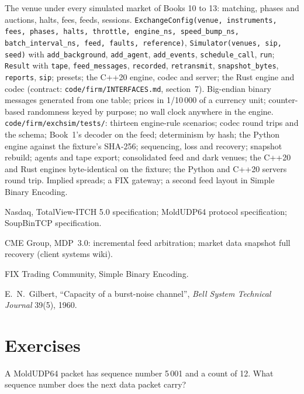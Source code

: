 \begin{build}
 The venue under every simulated market of Books 10 to 13: matching, phases and auctions, halts, fees, feeds, sessions.
 \texttt{ExchangeConfig(venue, instruments, fees, phases, halts, throttle, engine\_ns, speed\_bump\_ns, batch\_interval\_ns, feed,
faults, reference)}, \texttt{Simulator(venues, sip, seed)} with \texttt{add\_background}, \texttt{add\_agent}, \texttt{add\_events},
\texttt{schedule\_call}, \texttt{run}; \texttt{Result} with \texttt{tape}, \texttt{feed\_messages}, \texttt{recorded}, \texttt{retransmit},
\texttt{snapshot\_bytes}, \texttt{reports}, \texttt{sip}; presets; the C++20 engine, codec and server; the Rust engine and codec (contract:
\texttt{code/firm/INTERFACES.md}, section~7).
 Big-endian binary messages generated from one table; prices in 1/10\,000 of a currency unit; counter-based randomness keyed by purpose;
no wall clock anywhere in the engine.
 \texttt{code/firm/exchsim/tests/}: thirteen engine-rule scenarios; codec round trips and the schema; Book~1's decoder on the
feed; determinism by hash; the Python engine against the fixture's SHA-256; sequencing, loss and recovery; snapshot rebuild; agents and tape export;
consolidated feed and dark venues; the C++20 and Rust engines byte-identical on the fixture; the Python and C++20 servers round trip.
 Implied spreads; a FIX gateway; a second feed layout in Simple Binary Encoding.
\end{build}

\begin{omsources}
\item Nasdaq, TotalView-ITCH 5.0 specification; MoldUDP64 protocol specification; SoupBinTCP specification.
\item CME Group, MDP~3.0: incremental feed arbitration; market data snapshot full recovery (client systems wiki).
\item FIX Trading Community, Simple Binary Encoding.
\item E.~N.~Gilbert, ``Capacity of a burst-noise channel'', \emph{Bell System Technical Journal} 39(5), 1960.
\end{omsources}

\section{Exercises}

\begin{exercise}[$\star$]\label{exo:mx:build-a-matching-engine-and-exchange-simulator:1}
A MoldUDP64 packet has sequence number 5\,001 and a count of 12. What sequence number does the next data packet carry?
\end{exercise}

